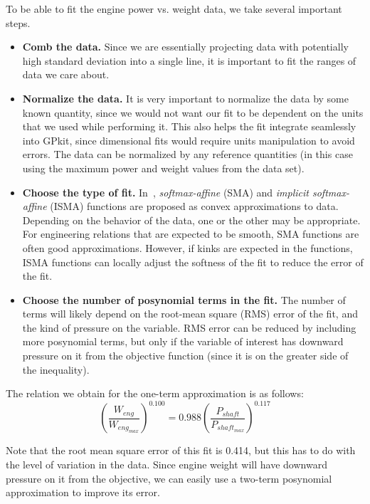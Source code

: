 To be able to fit the engine power vs. weight data, we take several important steps.
\begin{itemize}
    \item \textbf{Comb the data.} Since we are essentially projecting
    data with potentially high standard deviation into a single line,
    it is important to fit the ranges of data we care about.
    \item \textbf{Normalize the data.} It is very important to normalize the data
	by some known quantity, since we would not want our fit to be dependent on the
	units that we used while performing it. This also helps the fit integrate
    seamlessly into GPkit, since dimensional fits would require units manipulation
    to avoid errors. The data can be normalized by any
    reference quantities (in this case using the maximum power and weight values
    from the data set).
    \item \textbf{Choose the type of fit.} In~\cite{gpfitpaper}, \textit{softmax-affine}
    (SMA) and \textit{implicit softmax-affine} (ISMA)
    functions are proposed as convex approximations
    to data. Depending on the behavior of the data, one or the other
    may be appropriate. For engineering relations that are expected to be smooth, SMA
    functions are often good approximations. However, if kinks are expected in the
    functions, ISMA functions can locally adjust the softness of the fit to
    reduce the error of the fit.
    \item \textbf{Choose the number of posynomial terms in the fit.} The number of
    terms will likely depend on the root-mean square (RMS) error of the fit, and
    the kind of pressure on the variable. RMS error can be reduced by including
    more posynomial terms, but only if the variable of interest has downward
    pressure on it from the objective function (since it is on the greater side
    of the inequality).
\end{itemize}


The relation we obtain for the one-term approximation is as follows:
\begin{equation}
	(\frac{W_{eng}}{W_{eng_{max}}})^{0.100} = 0.988 (\frac{P_{shaft}}{P_{shaft_{max}}})^{0.117}
\end{equation}

Note that the root mean square error of this fit is 0.414, but this has to do with 
the level of variation in the data. Since engine weight will have downward pressure
on it from the objective, we can easily use a two-term posynomial approximation to 
improve its error. 

